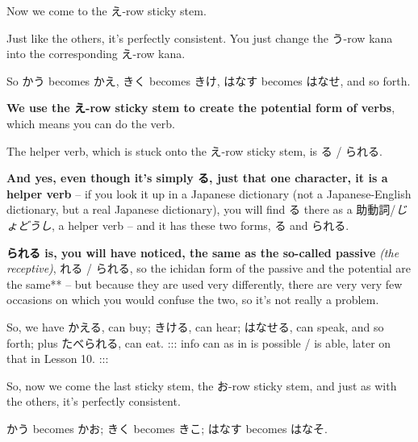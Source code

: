 \stopsectionlevel

\startsectionlevel[title={The え-stem},reference={the-え-stem}]

Now we come to the え-row sticky stem.

{}

Just like the others, it's perfectly consistent. You just change the う-row kana into the corresponding え-row kana.

So かう becomes かえ, きく becomes きけ, はなす becomes はなせ, and so forth.

\startsectionlevel[title={The potential},reference={the-potential}]

{\bf We use the え-row sticky stem to create the potential form of verbs}, which means you can do the verb.

The helper verb, which is stuck onto the え-row sticky stem, is る / られる.

{}

{\bf And yes, even though it's simply る, just that one character, it is a helper verb} -- if you look it up in a Japanese dictionary (not a Japanese-English dictionary, but a real Japanese dictionary), you will find る there as a 助動詞/{\em じょどうし}, a helper verb -- and it has these two forms, る and られる.

{\bf られる is, you will have noticed, the same as the so-called passive} {\em (the receptive)}, れる / られる, so the ichidan form of the passive and the potential are the same** -- but because they are used very differently, there are very very few occasions on which you would confuse the two, so it's not really a problem.

\thinrule

So, we have かえる, can buy; きける, can hear; はなせる, can speak, and so forth;\crlf
plus たべられる, can eat. ::: info can as in is possible / is able, later on that in Lesson 10. :::

\stopsectionlevel

\stopsectionlevel

\startsectionlevel[title={The お-stem},reference={the-お-stem}]

So, now we come the last sticky stem, the お-row sticky stem, and just as with the others, it's perfectly consistent.

{}

かう becomes かお; きく becomes きこ; はなす becomes はなそ.


